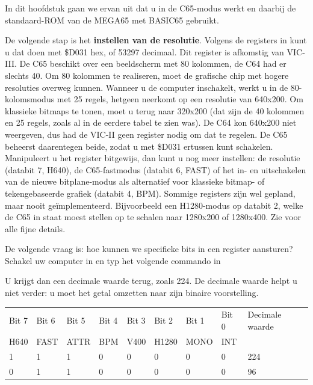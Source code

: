 In dit hoofdstuk gaan we ervan uit dat u in de C65-modus werkt en daarbij de standaard-ROM van de MEGA65 met BASIC65 gebruikt.


De volgende stap is het \textbf{instellen van de resolutie}. Volgens de registers in  kunt u dat doen met \$D031 hex, of 53297 decimaal. Dit register is afkomstig van VIC-III. De C65 beschikt over een beeldscherm met 80 kolommen, de C64 had er slechts 40. Om 80 kolommen te realiseren, moet de grafische chip met hogere resoluties overweg kunnen. Wanneer u de computer inschakelt, werkt u in de 80-kolomsmodus met 25 regels, hetgeen neerkomt op een resolutie van 640x200. Om klassieke bitmaps te tonen, moet u terug naar 320x200 (dat zijn de 40 kolommen en 25 regels, zoals al in de eerdere tabel te zien was). De C64 kon 640x200 niet weergeven, dus had de VIC-II geen register nodig om dat te regelen. De C65 beheerst daarentegen beide, zodat u met \$D031 ertussen kunt schakelen. Manipuleert u het register bitgewijs, dan kunt u nog meer instellen: de resolutie (databit 7, H640), de C65-fastmodus (databit 6, FAST) of het in- en uitschakelen van de nieuwe bitplane-modus als alternatief voor klassieke bitmap- of tekengebaseerde grafiek (databit 4, BPM). Sommige registers zijn wel gepland, maar nooit geïmplementeerd. Bijvoorbeeld een H1280-modus op databit 2, welke de C65 in staat moest stellen op te schalen naar 1280x200 of 1280x400. Zie  voor alle fijne details.

De volgende vraag is: hoe kunnen we specifieke bits in een register aansturen? Schakel uw computer in en typ het volgende commando in


U krijgt dan een decimale waarde terug, zoals 224. De decimale waarde helpt u niet verder: u moet het getal omzetten naar zijn binaire voorstelling.

\begin{tabular}{|l|l|l|l|l|l|l|l|l|}
	\hline
	Bit 7 & Bit 6 & Bit 5 & Bit 4 & Bit 3 & Bit 2 & Bit 1 & Bit 0 & Decimale waarde \\	H640 & FAST & ATTR & BPM & V400 & H1280 & MONO & INT & ~ \\
	\hline
    1 & 1 & 1 & 0 & 0 & 0 & 0 & 0 & 224 \\    0 & 1 & 1 & 0 & 0 & 0 & 0 & 0 & 96 \\
	\hline
\end{tabular}

